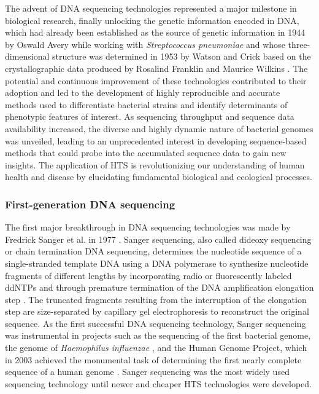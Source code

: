 The advent of \ac{DNA} sequencing technologies represented a major milestone in biological research, finally unlocking the genetic information encoded in \ac{DNA}, which had already been established as the source of genetic information in 1944 by Oswald Avery while working with \textit{Streptococcus pneumoniae} \cite{avery_studies_1944} and whose three-dimensional structure was determined in 1953 by Watson and Crick based on the crystallographic data produced by Rosalind Franklin and Maurice Wilkins \cite{watson_molecular_1953, zallen_despite_2003}. The potential and continuous improvement of these technologies contributed to their adoption and led to the development of highly reproducible and accurate methods used to differentiate bacterial strains and identify determinants of phenotypic features of interest. As sequencing throughput and sequence data availability increased, the diverse and highly dynamic nature of bacterial genomes was unveiled, leading to an unprecedented interest in developing sequence-based methods that could probe into the accumulated sequence data to gain new insights. The application of \ac{HTS} is revolutionizing our understanding of human health and disease by elucidating fundamental biological and ecological processes.

\subsubsection{First-generation DNA sequencing}

The first major breakthrough in \ac{DNA} sequencing technologies was made by Fredrick Sanger et al. in 1977 \cite{sanger_dna_1977}. Sanger sequencing, also called dideoxy sequencing or chain termination \ac{DNA} sequencing, determines the nucleotide sequence of a single-stranded template \ac{DNA} using a \ac{DNA} polymerase to synthesize nucleotide fragments of different lengths by incorporating radio or fluorescently labeled \ac{ddNTPs} and through premature termination of the \ac{DNA} amplification elongation step \cite{heather_sequence_2016, rodriguez_genesis_2023}. The truncated fragments resulting from the interruption of the elongation step are size-separated by capillary gel electrophoresis to reconstruct the original sequence. As the first successful \ac{DNA} sequencing technology, Sanger sequencing was instrumental in projects such as the sequencing of the first bacterial genome, the genome of \textit{Haemophilus influenzae} \cite{fleischmann_whole-genome_1995}, and the Human Genome Project, which in 2003 achieved the monumental task of determining the first nearly complete sequence of a human genome \cite{international_human_genome_sequencing_consortium_finishing_2004}.
Sanger sequencing was the most widely used sequencing technology until newer and cheaper \ac{HTS} technologies were developed.

